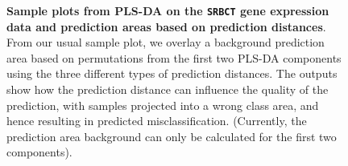 \documentclass[]{book}
\begin{document}
\begin{figure}

{\centering {}

}

\caption{\textbf{Sample plots from PLS-DA on the
\texttt{SRBCT} gene expression data and prediction areas based on
prediction distances}. From our usual sample plot, we overlay a
background prediction area based on permutations from the first two
PLS-DA components using the three different types of prediction
distances. The outputs show how the prediction distance can influence
the quality of the prediction, with samples projected into a wrong class
area, and hence resulting in predicted misclassification. (Currently,
the prediction area background can only be calculated for the first two
components).}\label{fig:plsda-background}
\end{figure}
\end{document}

